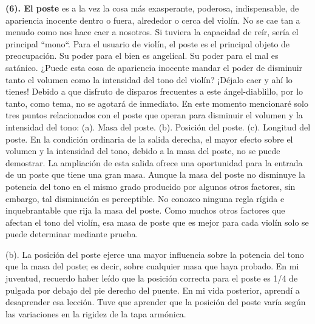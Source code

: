 \documentclass[12pt]{book}
\begin{document}
\textbf{(6). El poste} es a la vez la cosa más exasperante, poderosa, indispensable, de apariencia inocente dentro o fuera, alrededor o cerca del violín. No se cae tan a menudo como nos hace caer a nosotros. Si tuviera la capacidad de reír, sería el principal ``mono``. Para el usuario de violín, el poste es el principal objeto de preocupación. Su poder para el bien es angelical. Su poder para el mal es satánico. ¿Puede esta cosa de apariencia inocente mandar el poder de disminuir tanto el volumen como la intensidad del tono del violín? ¡Déjalo caer y ahí lo tienes! Debido a que disfruto de disparos frecuentes a este ángel-diablillo, por lo tanto, como tema, no se agotará de inmediato. En este momento mencionaré solo tres puntos relacionados con el poste que operan para disminuir el volumen y la intensidad del tono: (a). Masa del poste. (b). Posición del poste. (c). Longitud del poste. En la condición ordinaria de la salida derecha, el mayor efecto sobre el volumen y la intensidad del tono, debido a la masa del poste, no se puede demostrar. La ampliación de esta salida ofrece una oportunidad para la entrada de un poste que tiene una gran masa. Aunque la masa del poste no disminuye la potencia del tono en el mismo grado producido por algunos otros factores, sin embargo, tal disminución es perceptible. No conozco ninguna regla rígida e inquebrantable que rija la masa del poste. Como muchos otros factores que afectan el tono del violín, esa masa de poste que es mejor para cada violín solo se puede determinar mediante prueba.

(b). La posición del poste ejerce una mayor influencia sobre la potencia del tono que la masa del poste; es decir, sobre cualquier masa que haya probado. En mi juventud, recuerdo haber leído que la posición correcta para el poste es 1/4 de pulgada por debajo del pie derecho del puente. En mi vida posterior, aprendí a desaprender esa lección. Tuve que aprender que la posición del poste varía según las variaciones en la rigidez de la tapa armónica.
\end{document}
